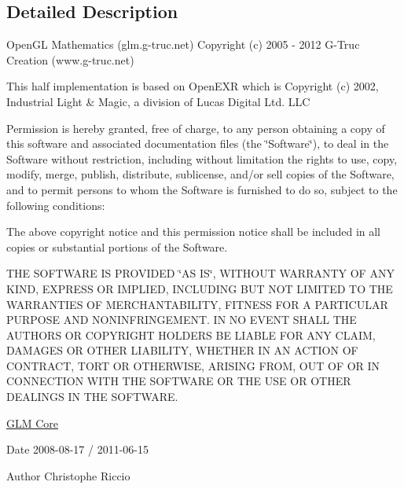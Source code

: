 \subsection{Detailed Description}
Open\-G\-L Mathematics (glm.\-g-\/truc.\-net) Copyright (c) 2005 -\/ 2012 G-\/\-Truc Creation (www.\-g-\/truc.\-net)

This half implementation is based on Open\-E\-X\-R which is Copyright (c) 2002, Industrial Light \& Magic, a division of Lucas Digital Ltd. L\-L\-C

Permission is hereby granted, free of charge, to any person obtaining a copy of this software and associated documentation files (the \char`\"{}\-Software\char`\"{}), to deal in the Software without restriction, including without limitation the rights to use, copy, modify, merge, publish, distribute, sublicense, and/or sell copies of the Software, and to permit persons to whom the Software is furnished to do so, subject to the following conditions\-:

The above copyright notice and this permission notice shall be included in all copies or substantial portions of the Software.

T\-H\-E S\-O\-F\-T\-W\-A\-R\-E I\-S P\-R\-O\-V\-I\-D\-E\-D \char`\"{}\-A\-S I\-S\char`\"{}, W\-I\-T\-H\-O\-U\-T W\-A\-R\-R\-A\-N\-T\-Y O\-F A\-N\-Y K\-I\-N\-D, E\-X\-P\-R\-E\-S\-S O\-R I\-M\-P\-L\-I\-E\-D, I\-N\-C\-L\-U\-D\-I\-N\-G B\-U\-T N\-O\-T L\-I\-M\-I\-T\-E\-D T\-O T\-H\-E W\-A\-R\-R\-A\-N\-T\-I\-E\-S O\-F M\-E\-R\-C\-H\-A\-N\-T\-A\-B\-I\-L\-I\-T\-Y, F\-I\-T\-N\-E\-S\-S F\-O\-R A P\-A\-R\-T\-I\-C\-U\-L\-A\-R P\-U\-R\-P\-O\-S\-E A\-N\-D N\-O\-N\-I\-N\-F\-R\-I\-N\-G\-E\-M\-E\-N\-T. I\-N N\-O E\-V\-E\-N\-T S\-H\-A\-L\-L T\-H\-E A\-U\-T\-H\-O\-R\-S O\-R C\-O\-P\-Y\-R\-I\-G\-H\-T H\-O\-L\-D\-E\-R\-S B\-E L\-I\-A\-B\-L\-E F\-O\-R A\-N\-Y C\-L\-A\-I\-M, D\-A\-M\-A\-G\-E\-S O\-R O\-T\-H\-E\-R L\-I\-A\-B\-I\-L\-I\-T\-Y, W\-H\-E\-T\-H\-E\-R I\-N A\-N A\-C\-T\-I\-O\-N O\-F C\-O\-N\-T\-R\-A\-C\-T, T\-O\-R\-T O\-R O\-T\-H\-E\-R\-W\-I\-S\-E, A\-R\-I\-S\-I\-N\-G F\-R\-O\-M, O\-U\-T O\-F O\-R I\-N C\-O\-N\-N\-E\-C\-T\-I\-O\-N W\-I\-T\-H T\-H\-E S\-O\-F\-T\-W\-A\-R\-E O\-R T\-H\-E U\-S\-E O\-R O\-T\-H\-E\-R D\-E\-A\-L\-I\-N\-G\-S I\-N T\-H\-E S\-O\-F\-T\-W\-A\-R\-E.

\hyperlink{group__core}{G\-L\-M Core}

\begin{DoxyDate}{Date}
2008-\/08-\/17 / 2011-\/06-\/15 
\end{DoxyDate}
\begin{DoxyAuthor}{Author}
Christophe Riccio 
\end{DoxyAuthor}

